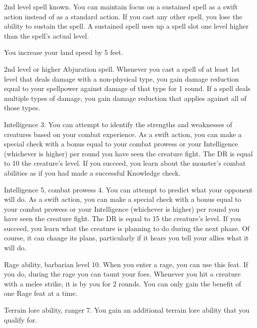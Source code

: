 \featpre 2nd level spell known.
\featben You can maintain focus on a sustained spell as a swift action instead of as a standard action.
If you cast any other spell, you lose the ability to sustain the spell.
A sustained spell uses up a spell slot one level higher than the spell's actual level.

\featben You increase your land speed by 5 feet.

\featpre 2nd level or higher Abjuration spell.
\featben Whenever you cast a spell of at least 1st level that deals damage with a non-physical type, you gain damage reduction equal to your spellpower against damage of that type for 1 round.
If a spell deals multiple types of damage, you gain damage reduction that applies against all of those types.

\featpre Intelligence 3.
\featben You can attempt to identify the strengths and weaknesses of creatures based on your combat experience.
As a swift action, you can make a special check with a bonus equal to your combat prowess or your Intelligence (whichever is higher)  per round you have seen the creature fight.
The DR is equal to 10 \add the creature's level.
If you succeed, you learn about the monster's combat abilities as if you had made a successful Knowledge check.

\featpres Intelligence 5, combat prowess 4.
\featben You can attempt to predict what your opponent will do.
As a swift action, you can make a special check with a bonus equal to your combat prowess or your Intelligence (whichever is higher)  per round you have seen the creature fight.
The DR is equal to 15 \add the creature's level.
If you succeed, you learn what the creature is planning to do during the next phase.
Of course, it can change its plans, particularly if it hears you tell your allies what it will do.

\featpre Rage ability, barbarian level 10.
\featben When you enter a rage, you can use this feat. If you do, during the rage you can taunt your foes.
Whenever you hit a creature with a melee strike, it is \taunted by you for 2 rounds.
 You can only gain the benefit of one Rage feat at a time.

\featpre Terrain lore ability, ranger 7.
\featben You gain an additional terrain lore ability that you qualify for.

